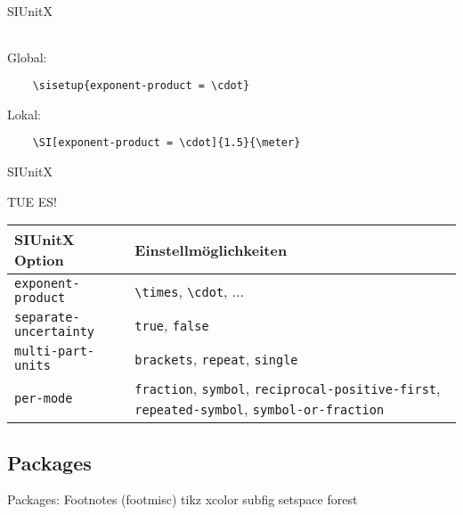 \documentclass["WS\space 16-17\space -\space LaTeX-Kurs\space -\space Praesentation\space -\space 4.tex"]{subfiles}
\begin{document}
\begin{frame}[fragile]{SIUnitX}
\begin{center}
\begin{tabular}{l >{\raggedright\arraybackslash}p{3cm} >{\raggedright\arraybackslash}p{1.5cm}}
			\bottomrule
		\end{tabular}
	\end{center}
	Global:\vspace{-0.1cm}
	\begin{lstlisting}
	\sisetup{exponent-product = \cdot}
	\end{lstlisting}
	\vspace{-0.2cm}Lokal:\vspace{-0.1cm}
	\begin{lstlisting}
	\SI[exponent-product = \cdot]{1.5}{\meter}
	\end{lstlisting}
\end{frame}
\begin{frame}[fragile]{SIUnitX}
	\begin{Aufgabe}
		TUE ES!
	\end{Aufgabe}
	\btVFill\Befehle
	\begin{center}
		\begin{tabular}{l >{\raggedright\arraybackslash}p{5cm}}
			\toprule
			SIUnitX Option						&	Einstellmöglichkeiten										\\ \midrule
			\lstinline|exponent-product|		&	\lstinline|\times|, \lstinline|\cdot|, ...					\\
			\lstinline|separate-uncertainty|	&	\lstinline|true|, \lstinline|false|							\\
			\lstinline|multi-part-units|		&	\lstinline|brackets|, \lstinline|repeat|, \lstinline|single|	\\
			\lstinline|per-mode|				&	\lstinline|fraction|, \lstinline|symbol|, \lstinline|reciprocal-positive-first|, \lstinline|repeated-symbol|, \lstinline|symbol-or-fraction|	\\
			\bottomrule
		\end{tabular}
	\end{center}
	\vspace{0.1cm}
\end{frame}


\subsection{Packages}
\begin{frame}[c]
	\begin{center}
		\large Packages:  Footnotes (footmisc)  
		tikz  xcolor subfig   setspace forest
	\end{center}
\end{frame}
\end{document}
